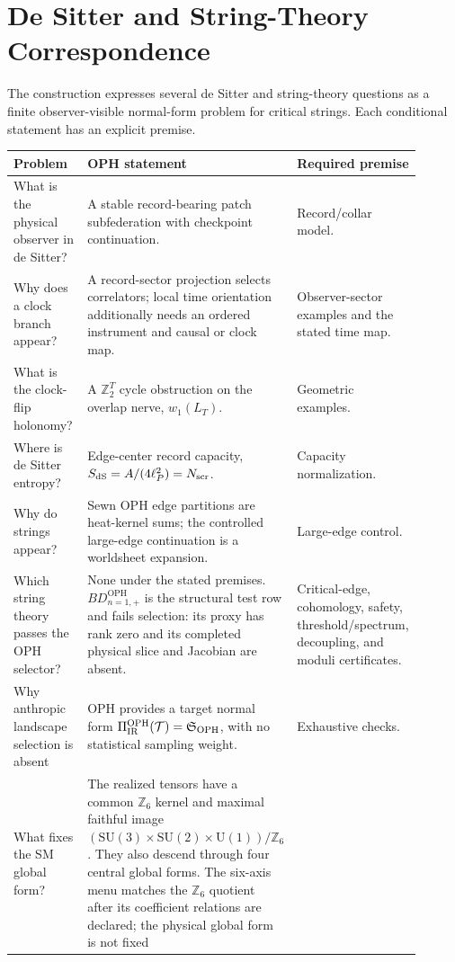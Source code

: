 \documentclass[11pt]{article}
\theoremstyle{remark}
\theoremstyle{plain}
\newcommand{\OPH}{\mathrm{OPH}}
\newcommand{\SU}{\mathrm{SU}}
\newcommand{\U}{\mathrm{U}}
\newcommand{\Z}{\mathbb Z}
\begin{document}
\section{De Sitter and String-Theory Correspondence}

The construction expresses several de Sitter and string-theory questions as a finite
observer-visible normal-form problem for critical strings. Each conditional statement has an
explicit premise.

\begin{longtable}{L{0.27\linewidth}L{0.43\linewidth}L{0.20\linewidth}}
\toprule
\textbf{Problem} & \textbf{OPH statement} & \textbf{Required premise} \\
\midrule
What is the physical observer in de Sitter? & A stable record-bearing patch subfederation with
checkpoint continuation. & Record/collar model. \\
Why does a clock branch appear? & A record-sector projection selects correlators;
local time orientation additionally needs an ordered instrument and causal or
clock map. & Observer-sector examples and the stated time map. \\
What is the clock-flip holonomy? & A \(\Z_2^T\) cycle obstruction on the overlap nerve,
\(w_1(L_T)\). & Geometric examples. \\
Where is de Sitter entropy? & Edge-center record capacity,
\(S_{\rm dS}=A/(4\ell_P^2)=N_{\rm scr}\). & Capacity normalization. \\
Why do strings appear? & Sewn OPH edge partitions are heat-kernel sums; the controlled
large-edge continuation is a worldsheet expansion. & Large-edge control. \\
Which string theory passes the OPH selector? & None under the stated premises.
\(BD_{n=1,+}^{\OPH}\) is the structural test row and fails selection: its proxy has rank
zero and its completed physical slice and Jacobian are absent. & Critical-edge, cohomology, safety,
threshold/spectrum, decoupling, and moduli certificates. \\
Why anthropic landscape selection is absent & OPH provides a target normal form
\(\Pi_{\rm IR}^{\OPH}(\mathcal T)=\mathfrak S_{\OPH}\), with no statistical sampling weight. & Exhaustive checks. \\
What fixes the SM global form? & The realized tensors have a common \(\Z_6\) kernel and maximal
faithful image \((\SU(3)\times\SU(2)\times\U(1))/\Z_6\). They also descend through four central
global forms. The six-axis menu matches the \(\Z_6\) quotient after its
coefficient relations are declared; the physical global form is not fixed

\end{longtable}
\end{document}
